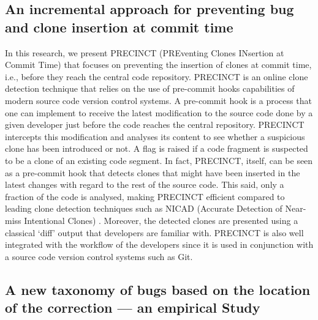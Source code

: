 \subsection{An incremental approach for preventing bug and clone insertion at commit time}
In this research, we present PRECINCT (PREventing Clones INsertion at Commit Time) that focuses on preventing the
insertion of clones at commit time, i.e., before they reach the central code repository.
PRECINCT is an online clone
detection technique that relies on the use of pre-commit hooks capabilities of modern source code version control systems.
A pre-commit hook is a process that one can implement to receive the latest modification to the source code done by a given developer just before the code reaches the central repository.
PRECINCT intercepts this modification and analyses its content to see whether a suspicious clone has been introduced
or not.
A flag is raised if a code fragment is suspected to be a clone of an existing code segment.
In fact, PRECINCT, itself, can be seen as a pre-commit hook that detects clones that might have been inserted in the latest changes with regard to the rest of the source code.
This said, only a fraction of the
code is analysed, making PRECINCT efficient compared to leading clone detection techniques such as NICAD (Accurate Detection of Near-miss Intentional Clones) \cite{Roy2008,Cordy2011}.
Moreover, the detected clones are presented using a classical ‘diff’ output that developers are familiar with.
PRECINCT is also well
integrated with the workflow of the developers since it is used in conjunction with a source code version control systems such as Git.

\subsection{A new taxonomy of bugs based on the location of the correction --- an empirical Study}

